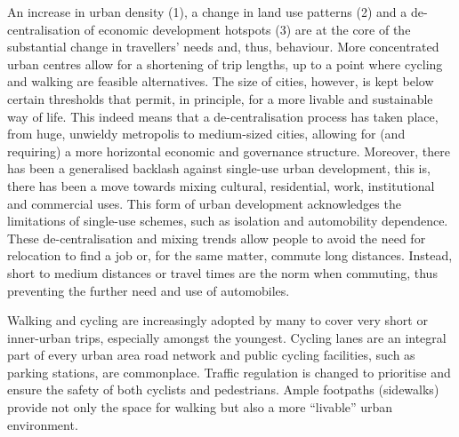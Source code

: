 {An increase in urban density (1), a change in land use patterns (2) and a de-centralisation of economic development hotspots (3) are at the core of the substantial change in travellers' needs and, thus, behaviour. More concentrated urban centres allow for a shortening of trip lengths, up to a point where cycling and walking are feasible alternatives. The size of cities, however, is kept below certain thresholds that permit, in principle, for a more livable and sustainable way of life. This indeed means that a de-centralisation process has taken place, from huge, unwieldy metropolis to medium-sized cities, allowing for (and requiring) a more horizontal economic and governance structure. Moreover, there has been a generalised backlash against single-use urban development, this is, there has been a move towards mixing cultural, residential, work, institutional and commercial uses. This form of urban development acknowledges the limitations of single-use schemes, such as isolation and automobility dependence. These de-centralisation and mixing trends allow people to avoid the need for relocation to find a job or, for the same matter, commute long distances. Instead, short to medium distances or travel times are the norm when commuting, thus preventing the further need and use of automobiles.

Walking and cycling are increasingly adopted by many to cover very short or inner-urban trips, especially amongst the youngest. Cycling lanes are an integral part of every urban area road network and public cycling facilities, such as parking stations, are commonplace. Traffic regulation is changed to prioritise and ensure the safety of both cyclists and pedestrians. Ample footpaths (sidewalks) provide not only the space for walking but also a more ``livable'' urban environment.
}

